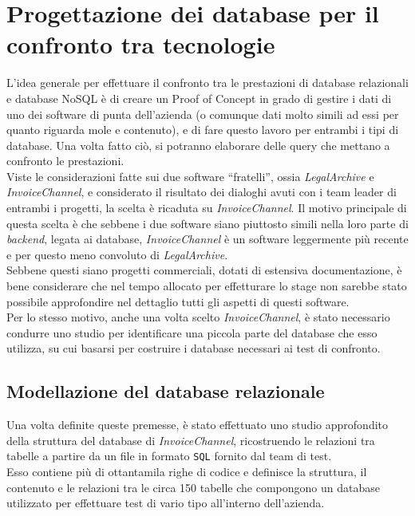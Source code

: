 
\chapter{Progettazione dei database per il confronto tra tecnologie}
\label{cap:progettazione}

L'idea generale per effettuare il confronto tra le prestazioni di database relazionali e database NoSQL è di creare un \gls{Proof of Concept} in grado di gestire i dati di uno dei software di punta dell'azienda (o comunque dati molto simili ad essi per quanto riguarda mole e contenuto), e di fare questo lavoro per entrambi i tipi di database. Una volta fatto ciò, si potranno elaborare delle query che mettano a confronto le prestazioni.\\

\noindent Viste le considerazioni fatte sui due software ``fratelli'', ossia \textit{LegalArchive} e \textit{InvoiceChannel}, e considerato il risultato dei dialoghi avuti con i team leader di entrambi i progetti, la scelta è ricaduta su \textit{InvoiceChannel}. Il motivo principale di questa scelta è che sebbene i due software siano piuttosto simili nella loro parte di \textit{backend}, legata ai database, \textit{InvoiceChannel} è un software leggermente più recente e per questo meno convoluto di \textit{LegalArchive}.\\
Sebbene questi siano progetti commerciali, dotati di estensiva documentazione, è bene considerare che nel tempo allocato per effetturare lo stage non sarebbe stato possibile approfondire nel dettaglio tutti gli aspetti di questi software.\\
Per lo stesso motivo, anche una volta scelto \textit{InvoiceChannel}, è stato necessario condurre uno studio per identificare una piccola parte del database che esso utilizza, su cui basarsi per costruire i database necessari ai test di confronto.\\


\section{Modellazione del database relazionale}
Una volta definite queste premesse, è stato effettuato uno studio approfondito della struttura del database di \textit{InvoiceChannel}, ricostruendo le relazioni tra tabelle a partire da un file in formato \texttt{SQL} fornito dal team di test.\\
Esso contiene più di ottantamila righe di codice e definisce la struttura, il contenuto e le relazioni tra le circa 150 tabelle che compongono un database utilizzato per effettuare test di vario tipo all'interno dell'azienda.\\

